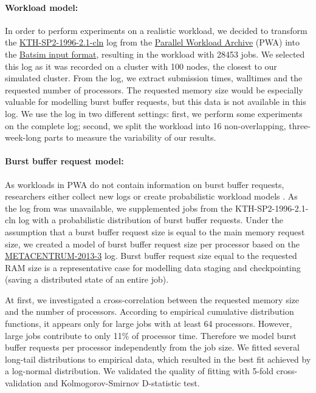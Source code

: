 \documentclass[runningheads]{llncs}
\begin{document}
\paragraph{Workload model:}
In order to perform experiments on a realistic workload, we decided to transform the \href{https://www.cs.huji.ac.il/labs/parallel/workload/l_kth_sp2/index.html}{KTH-SP2-1996-2.1-cln} log from the \href{https://www.cs.huji.ac.il/labs/parallel/workload/}{Parallel Workload Archive} (PWA) \cite{FEITELSON20142967} into the \href{https://batsim.readthedocs.io/en/latest/input-workload.html}{Batsim input format}, resulting in the workload with 28453 jobs. We selected this log as it was recorded on a cluster with 100 nodes, the closest to our simulated cluster. From the log, we extract submission times, walltimes and the requested number of processors. The requested memory size would be especially valuable for modelling burst buffer requests, but this data is not available in this log. We use the log in two different settings: first, we perform some experiments on the complete log; second, we split the workload into 16 non-overlapping, three-week-long parts to measure the variability of our results. 

\paragraph{Burst buffer request model:}
As workloads in PWA do not contain information on burst buffer requests, researchers either collect new logs \cite{10.1145/3307681.3325401} or create probabilistic workload models \cite{8752797,10.1145/2907294.2907316}. As the log from \cite{10.1145/3307681.3325401} was unavailable, we supplemented jobs from the KTH-SP2-1996-2.1-cln log with a probabilistic distribution of burst buffer requests. Under the assumption that a burst buffer request size is equal to the main memory request size, we created a model of burst buffer request size per processor based on the \href{https://www.cs.huji.ac.il/labs/parallel/workload/l_metacentrum2/index.html}{METACENTRUM-2013-3} log. Burst buffer request size equal to the requested RAM size is a representative case for modelling data staging and checkpointing (saving a distributed state of an entire job).

At first, we investigated a cross-correlation between the requested memory size and the number of processors. According to empirical cumulative distribution functions, it appears only for large jobs with at least 64 processors. However, large jobs contribute to only 11\% of processor time. Therefore we model burst buffer requests per processor independently from the job size. We fitted several long-tail distributions to empirical data, which resulted in the best fit achieved by a log-normal distribution. We validated the quality of fitting with 5-fold cross-validation and Kolmogorov-Smirnov D-statistic test.
\end{document}
